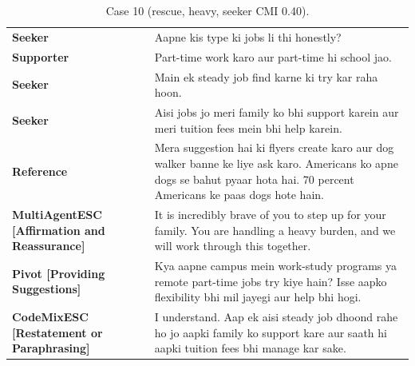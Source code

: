 \begin{table}[t]
\centering\footnotesize
\caption{Case 10 (rescue, heavy, seeker CMI 0.40).}
\label{tab:case10}
\begin{tabular}{@{}p{}p{}@{}}
\toprule
\textbf{Seeker} & Aapne kis type ki jobs li thi honestly? \\
\textbf{Supporter} & Part-time work karo aur part-time hi school jao. \\
\textbf{Seeker} & Main ek steady job find karne ki try kar raha hoon. \\
\textbf{Seeker} & Aisi jobs jo meri family ko bhi support karein aur meri tuition fees mein bhi help karein. \\
\textbf{Reference} & Mera suggestion hai ki flyers create karo aur dog walker banne ke liye ask karo. Americans ko apne dogs se bahut pyaar hota hai. 70 percent Americans ke paas dogs hote hain. \\
\textbf{MultiAgentESC [Affirmation and Reassurance]} & It is incredibly brave of you to step up for your family. You are handling a heavy burden, and we will work through this together. \\
\textbf{Pivot [Providing Suggestions]} & Kya aapne campus mein work-study programs ya remote part-time jobs try kiye hain? Isse aapko flexibility bhi mil jayegi aur help bhi hogi. \\
\textbf{CodeMixESC [Restatement or Paraphrasing]} & I understand. Aap ek aisi steady job dhoond rahe ho jo aapki family ko support kare aur saath hi aapki tuition fees bhi manage kar sake. \\
\bottomrule
\end{tabular}
\end{table}

